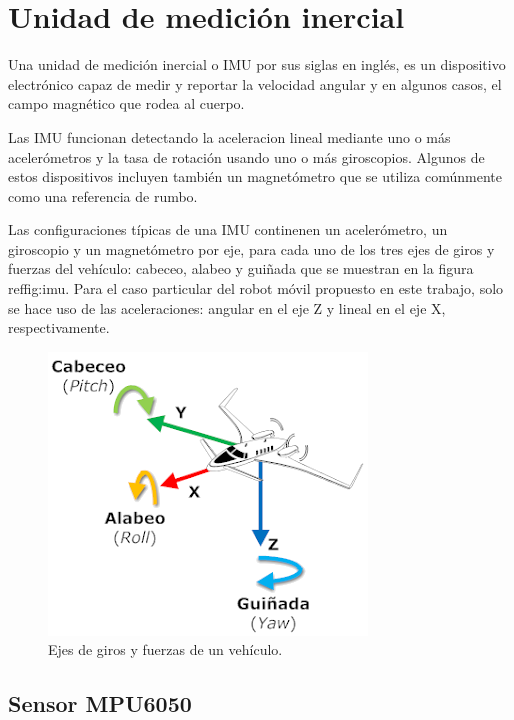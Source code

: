 \section{Unidad de medición inercial}

Una unidad de medición inercial o IMU por sus siglas en inglés, es un dispositivo electrónico capaz de medir y reportar la velocidad angular y en algunos casos, el campo magnético que rodea al cuerpo.

Las IMU funcionan detectando la aceleracion lineal mediante uno o más acelerómetros y la tasa de rotación usando uno o más giroscopios. Algunos de estos dispositivos incluyen también un magnetómetro que se utiliza comúnmente como una referencia de rumbo.

Las configuraciones típicas de una IMU continenen un acelerómetro, un giroscopio y un magnetómetro por eje, para cada uno de los tres ejes de giros y fuerzas del vehículo: cabeceo, alabeo y guiñada que se muestran en la figura ref{fig:imu}. Para el caso particular del robot móvil propuesto en este trabajo, solo se hace uso de las aceleraciones: angular en el eje Z y lineal en el eje X, respectivamente.

\begin{figure}[ht]
    \centering
    \includegraphics[scale=1.8]{./Figures/imu.png}
    \caption{Ejes de giros y fuerzas de un vehículo.\protect\footnotemark}
    \label{fig:depthMap}
\end{figure}


\subsection{Sensor MPU6050}\label{sec:mpu6050}

